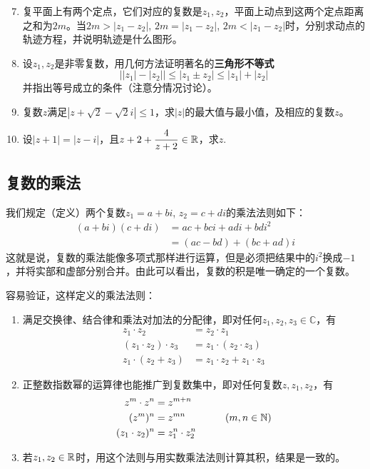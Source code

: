 \begin{enumerate}\setcounter{enumi}{6}
\item 复平面上有两个定点，它们对应的复数是$z_1,z_2$，平面上动点到这两个定点距离之和为$2m$。当$2m>|z_1-z_2|$, $2m=|z_1-z_2|$, $2m<|z_1-z_2|$时，分别求动点的轨迹方程，并说明轨迹是什么图形。
\item 设$z_1,z_2$是非零复数，用几何方法证明著名的\textbf{三角形不等式}
\[\big||z_1|-|z_2| \big|\le |z_1\pm z_2|\le |z_1|+|z_2|\]
并指出等号成立的条件（注意分情况讨论）。
\item 复数$z$满足$|z+\sqrt{2}-\sqrt{2}i|\le 1$，求$|z|$的最大值与最小值，及相应的复数$z$。
\item 设$|z+1|=|z-i|$，且$z+2+\dfrac{4}{z+2}\in\mathbb{R}$，求$z$.
\end{enumerate}

\subsection{复数的乘法}
我们规定（定义）两个复数$z_1=a+bi$, $z_2=c+di$的乘法法则如下：
\[\begin{split}
   (a+bi)(c+di)&=ac+bci+adi+bdi^2\\
&=(ac-bd)+(bc+ad)i 
\end{split}\]
这就是说，复数的乘法能像多项式那样进行运算，但是必须把结果中的$i^2$换成$-1$，并将实部和虚部分别合并。由此可以看出，复数的积是唯一确定的一个复数。

容易验证，这样定义的乘法法则：
\begin{enumerate}[(1)]
\item 满足交换律、结合律和乘法对加法的分配律，即对任何$z_1,z_2,z_3\in\mathbb{C}$，有
\[\begin{split}
 z_1\cdot z_2&=z_2\cdot z_1\\
(z_1\cdot z_2)\cdot z_3&=z_1\cdot (z_2\cdot z_3)\\
z_1\cdot (z_2+z_3)&=z_1\cdot z_2+z_1\cdot z_3   
\end{split}\]

\item 正整数指数幂的运算律也能推广到复数集中，即对任何复数$z,z_1,z_2$，有
\[\begin{split}
    z^m\cdot z^n&=z^{m+n}\\
    (z^m)^n&=z^{m n}\qquad \qquad (m,n\in\mathbb{N})\\
    (z_1\cdot z_2)^n&=z_1^n\cdot z_2^n
\end{split}\]
\item 若$z_1,z_2\in\mathbb{R}$时，用这个法则与用实数乘法法则计算其积，结果是一致的。
\end{enumerate}

